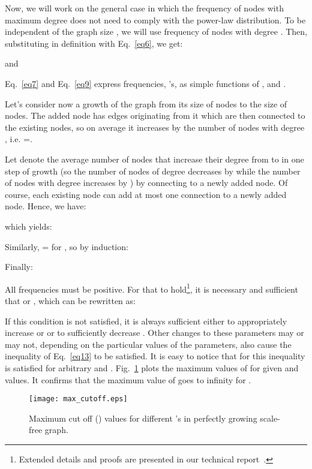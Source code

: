 \documentclass[10pt,journal,cspaper,compsoc]{IEEEtran}
\begin{document}
Now, we will work on the general case in which the frequency of nodes with maximum degree does not need to comply with the power-law distribution. To be independent of the graph size , we will use frequency  of nodes with degree . Then, substituting  in  definition with Eq.~\ref{eq6}, we get:

and


Eq.~\ref{eq7} and Eq.~\ref{eq9} express frequencies, 's, as simple functions of ,  and .

Let's consider now a growth of the graph from its size of  nodes to the size of  nodes. The added node has  edges originating from it which are then connected to the existing nodes, so on average it increases by  the number of nodes with degree , i.e. =.

Let  denote the average number of nodes that increase their degree from  to  in one step of growth (so the number of nodes of degree  decreases by  while the number of nodes with degree  increases by ) by connecting to a newly added node. Of course, each existing node can add at most one connection to a newly added node. Hence, we have:

which yields:


Similarly,   =  for , so by induction:


Finally:


All frequencies must be positive. For that to hold\footnote{Extended details and proofs are presented in our technical report~\cite{RN-NEST-01-2011}.}, it is necessary and sufficient that  or , which can be rewritten as:



If this condition is not satisfied, it is always sufficient either to appropriately increase  or  or to sufficiently decrease . Other changes to these parameters may or may not, depending on the particular values of the parameters, also cause the inequality of Eq.~\ref{eq13} to be satisfied. It is easy to notice that for  this inequality is satisfied for arbitrary  and . Fig.~\ref{fig:maxm} plots the maximum values of  for given  and  values. It confirms that the maximum value of  goes to infinity for .

\begin{figure}
\centering
\texttt{[image: max\_cutoff.eps]}
\caption{Maximum cut off () values for different 's in perfectly growing scale-free graph.}
\label{fig:maxm}
\end{figure}
\end{document}
